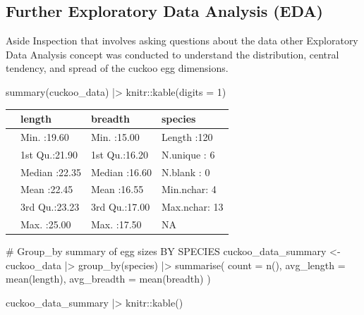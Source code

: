 \documentclass[
  letterpaper,
  DIV=11,
  numbers=noendperiod]{scrartcl}
\newenvironment{Shaded}{\begin{snugshade}}{\end{snugshade}}
\newcommand{\AttributeTok}[1]{\textcolor[rgb]{0.40,0.45,0.13}{#1}}
\newcommand{\CommentTok}[1]{\textcolor[rgb]{0.37,0.37,0.37}{#1}}
\newcommand{\DecValTok}[1]{\textcolor[rgb]{0.68,0.00,0.00}{#1}}
\newcommand{\FunctionTok}[1]{\textcolor[rgb]{0.28,0.35,0.67}{#1}}
\newcommand{\NormalTok}[1]{\textcolor[rgb]{0.00,0.23,0.31}{#1}}
\newcommand{\OtherTok}[1]{\textcolor[rgb]{0.00,0.23,0.31}{#1}}
\newcommand{\SpecialCharTok}[1]{\textcolor[rgb]{0.37,0.37,0.37}{#1}}
\newcounter{none} %
\begin{document}
\subsection{Further Exploratory Data Analysis
(EDA)}\label{further-exploratory-data-analysis-eda}

Aside Inspection that involves asking questions about the data other
Exploratory Data Analysis concept was conducted to understand the
distribution, central tendency, and spread of the cuckoo egg dimensions.

\begin{Shaded}
\begin{Highlighting}[]
\FunctionTok{summary}\NormalTok{(cuckoo\_data) }\SpecialCharTok{|\textgreater{}} 
\NormalTok{  knitr}\SpecialCharTok{::}\FunctionTok{kable}\NormalTok{(}\AttributeTok{digits =} \DecValTok{1}\NormalTok{)}
\end{Highlighting}
\end{Shaded}

{\def\LTcaptype{none} %
\begin{longtable}[]{@{}llll@{}}
\toprule\noalign{}
& length & breadth & species \\
\midrule\noalign{}
\endhead
\bottomrule\noalign{}
\endlastfoot
& Min. :19.60 & Min. :15.00 & Length :120 \\
& 1st Qu.:21.90 & 1st Qu.:16.20 & N.unique : 6 \\
& Median :22.35 & Median :16.60 & N.blank : 0 \\
& Mean :22.45 & Mean :16.55 & Min.nchar: 4 \\
& 3rd Qu.:23.23 & 3rd Qu.:17.00 & Max.nchar: 13 \\
& Max. :25.00 & Max. :17.50 & NA \\
\end{longtable}
}

\begin{Shaded}
\begin{Highlighting}[]
\CommentTok{\# Group\_by summary of egg sizes BY SPECIES}
\NormalTok{cuckoo\_data\_summary }\OtherTok{\textless{}{-}}\NormalTok{ cuckoo\_data }\SpecialCharTok{|\textgreater{}}
  \FunctionTok{group\_by}\NormalTok{(species) }\SpecialCharTok{|\textgreater{}}
  \FunctionTok{summarise}\NormalTok{(}
    \AttributeTok{count =} \FunctionTok{n}\NormalTok{(),}
    \AttributeTok{avg\_length =} \FunctionTok{mean}\NormalTok{(length),}
    \AttributeTok{avg\_breadth =} \FunctionTok{mean}\NormalTok{(breadth)}
\NormalTok{  )}

\NormalTok{cuckoo\_data\_summary }\SpecialCharTok{|\textgreater{}} 
\NormalTok{  knitr}\SpecialCharTok{::}\FunctionTok{kable}\NormalTok{()}
\end{Highlighting}
\end{Shaded}
\end{document}
